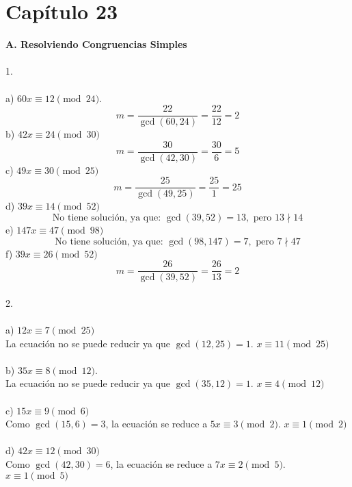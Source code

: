 \documentclass{article}
\begin{document}
\section*{Capítulo 23}
\textbf{A. Resolviendo Congruencias Simples}
\\
\\
1.
\\
\\
a) $60x \equiv 12 \pmod{24}$. 
\begin{equation*}
    m = \frac{22}{\gcd{(60,24)}} = \frac{22}{12} = 2
\end{equation*}
b) $42x \equiv 24 \pmod{30}$
\begin{equation*}
    m = \frac{30}{\gcd{(42,30)}} = \frac{30}{6} = 5
\end{equation*}
c) $49x \equiv 30 \pmod{25}$
\begin{equation*}
    m = \frac{25}{\gcd{(49,25)}} = \frac{25}{1} = 25
\end{equation*}
d) $39x \equiv 14 \pmod{52}$
\begin{equation*}
    \text{No tiene solución, ya que: } \gcd{(39,52)} = 13, \text{ pero } 13 \nmid 14
\end{equation*}
e) $147x \equiv 47 \pmod{98}$
\begin{equation*}
    \text{No tiene solución, ya que: } \gcd{(98,147)=7,} \text{ pero } 7 \nmid 47
\end{equation*}
f) $39x \equiv 26 \pmod{52}$
\begin{equation*}
    m= \frac{26}{\gcd{(39,52)}} = \frac{26}{13} = 2
\end{equation*}
\\
2.
\\
\\
a) $12x \equiv 7 \pmod{25}$
\\
La ecuación no se puede reducir ya que $\gcd{(12,25)}=1$. $x \equiv 11 \pmod{25}$
\\
\\
b) $35x \equiv 8 \pmod{12}$.
\\
La ecuación no se puede reducir ya que $\gcd{(35,12)}=1$. $x \equiv 4 \pmod{12}$
\\
\\
c) $15x \equiv 9 \pmod{6}$
\\
Como $\gcd{(15,6)}=3$, la ecuación se reduce a $5x \equiv 3 \pmod{2}$. $x \equiv 1 \pmod{2}$
\\
\\
d) $42x \equiv 12 \pmod{30}$
\\
Como $\gcd{(42,30)}=6$, la ecuación se reduce a $7x \equiv 2 \pmod{5}$. $x \equiv 1 \pmod{5}$
\end{document}
